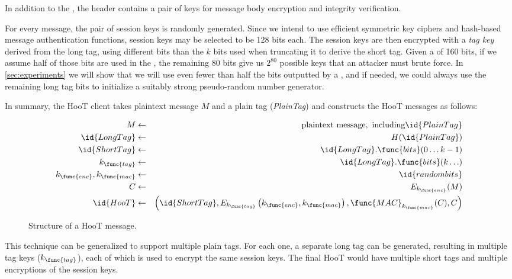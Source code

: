%
In addition to the , the header contains a pair of keys
for message body encryption and integrity verification.

For every message, the pair of session keys is randomly generated. Since we intend
to use efficient symmetric key ciphers and hash-based message authentication
functions, session keys may be selected to be 128 bits each. The session keys
are then encrypted with a {\em tag key} derived from the long tag, using
different bits than the $k$ bits used when truncating it to derive the
short tag. Given a  of 160 bits, if we assume half of those bits
are used in the , the remaining 80 bits give
us $2^80$ possible keys that an attacker must brute force. In \ref{sec:experiments}
we will show that we will use even fewer than half the bits outputted by a , and if
needed, we could always use the remaining long tag bits
to initialize a suitably strong pseudo-random number generator.

In summary, the HooT client takes plaintext message $M$ and a plain tag
({\em PlainTag}) and constructs the HooT messages as follows:
%

\begin{figure}
\begin{eqnarray*}
M & \leftarrow & \mathrm{plaintext\ message,\ including} \id{PlainTag}
\\
\id{LongTag} & \leftarrow & H(\id{PlainTag}) \\
\id{ShortTag} & \leftarrow & \id{LongTag}.\func{bits}(0 \ldots k-1) \\
k_{\func{tag}} & \leftarrow & \id{LongTag}.\func{bits}(k \ldots) \\
k_{\func{enc}}, k_{\func{mac}} & \leftarrow & \id{random bits} \\
C & \leftarrow & E_{k_{\func{enc}}}(M) \\
\id{HooT}  & \leftarrow &  \left(\id{ShortTag}, E_{k_{\func{tag}}}\left(k_{\func{enc}}, k_{\func{mac}}\right), \func{MAC}_{k_{\func{mac}}}(C), C\right)
\end{eqnarray*}
\caption{Structure of a HooT message.\label{fig:hoot-structure}}
\end{figure}
%
This technique can be generalized to support multiple plain tags. For
each one, a separate long tag can be generated, resulting in multiple
tag keys ($k_{\func{tag}}$), each of which is used to encrypt the same
session keys. The final HooT would have multiple short tags and multiple
encryptions of the session keys.

